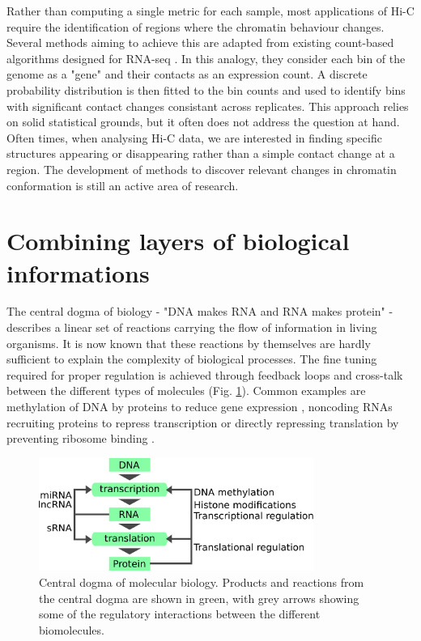 Rather than computing a single metric for each sample, most applications of Hi-C require the identification of regions where the chromatin behaviour changes. Several methods aiming to achieve this are adapted from existing count-based algorithms designed for RNA-seq \citep{lunDiffHicBioconductorPackage2015,stansfieldMultiHiCcompareJointNormalization2019,heinzSimpleCombinationsLineageDetermining2010}. In this analogy, they consider each bin of the genome as a "gene" and their contacts as an expression count. A discrete probability distribution is then fitted to the bin counts and used to identify bins with significant contact changes consistant across replicates. This approach relies on solid statistical grounds, but it often does not address the question at hand. Often times, when analysing Hi-C data, we are interested in finding specific structures appearing or disappearing rather than a simple contact change at a region. The development of methods to discover relevant changes in chromatin conformation is still an active area of research.

\section{Combining layers of biological informations}

The central dogma of biology - "DNA makes RNA and RNA makes protein" - describes a linear set of reactions carrying the flow of information in living organisms. It is now known that these reactions by themselves are hardly sufficient to explain the complexity of biological processes. The fine tuning required for proper regulation is achieved through feedback loops and cross-talk between the different types of molecules (Fig. \ref{fig:01-02:central-dogma}). Common examples are methylation of DNA by proteins to reduce gene expression \cite{zemachGenomeWideEvolutionaryAnalysis2010}, noncoding RNAs recruiting proteins to repress transcription \cite{wangLongNoncodingRNA2018} or directly repressing translation by preventing ribosome binding \cite{sharmaSmallRNARegulates2007,vecerekControlFurSynthesis2007}.

\begin{figure}[htb]
    \centering
    \includegraphics[width=0.8\textwidth]{Parts/Part01/gfx/central_dogma_regulation.pdf}
    \caption[Central dogma of molecular biology.]{Central dogma of molecular biology. Products and reactions from the central dogma are shown in green, with grey arrows showing some of the regulatory interactions between the different biomolecules.}
    \label{fig:01-02:central-dogma}
\end{figure}

